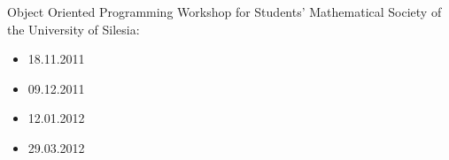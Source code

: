 \noindent Object Oriented Programming Workshop for Students' Mathematical Society of the University of Silesia:
\begin{itemize}
  \item 18.11.2011
  \item 09.12.2011
  \item 12.01.2012
  \item 29.03.2012
\end{itemize}
